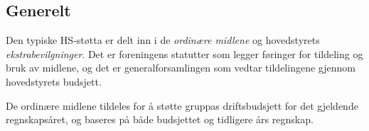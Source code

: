 \subsection{Generelt}
Den typiske HS-støtta er delt inn i de \emph{ordinære midlene} og hovedstyrets \emph{ekstrabevilgninger}.
Det er foreningens statutter som legger føringer for tildeling og bruk av midlene, og det er generalforsamlingen som vedtar tildelingene gjennom hovedstyrets budsjett.\linebreak

De ordinære midlene tildeles for å støtte gruppas driftsbudsjett for det gjeldende regnskapsåret, og baseres på både budsjettet og tidligere års regnskap.
